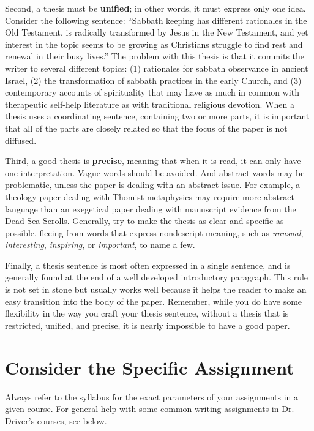 \documentclass[11pt]{article}
\begin{document}
Second, a thesis must be \textbf{unified}; in other words, it must
express only one idea. Consider the following sentence: “Sabbath keeping
has different rationales in the Old Testament, is radically transformed
by Jesus in the New Testament, and yet interest in the topic seems to be
growing as Christians struggle to find rest and renewal in their busy
lives.” The problem with this thesis is that it commits the writer to
several different
topics: (1) rationales for sabbath observance in ancient
Israel, (2) the transformation of sabbath practices in the early Church,
and (3) contemporary accounts of spirituality that may have as much in
common with therapeutic self-help literature as with traditional
religious devotion. When a thesis uses a coordinating sentence,
containing two or more parts, it is important that all of the parts are
closely related so that the focus of the paper is not diffused.

Third, a good thesis is \textbf{precise}, meaning that when it is read,
it can only have one interpretation. Vague words should be avoided. And
abstract words may be problematic, unless the paper is dealing with an
abstract issue. For example, a theology paper dealing with Thomist
metaphysics may require more abstract language than an exegetical paper
dealing with manuscript evidence from the Dead Sea Scrolls. Generally,
try to make the thesis as clear and specific as possible, fleeing from
words that express nondescript meaning, such as \emph{unusual},
\emph{interesting}, \emph{inspiring}, or \emph{important}, to name a
few.

Finally, a thesis sentence is most often expressed in a single sentence,
and is generally found at the end of a well developed introductory
paragraph. This rule is not set in stone but usually works well because
it helps the reader to make an easy transition into the body of the
paper. Remember, while you do have some flexibility in the way you craft
your thesis sentence, without a thesis that is restricted, unified, and
precise, it is nearly impossible to have a good paper.

\section{Consider the Specific Assignment}

Always refer to the syllabus for the exact parameters of your
assignments in a given course. For general help with some common writing
assignments in Dr. Driver's courses, see below.
\end{document}
